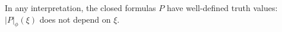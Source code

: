 In any interpretation, the closed formulas $P$ have well-defined truth values: $|P|_\phi(\xi)$ does not depend on $\xi$.
